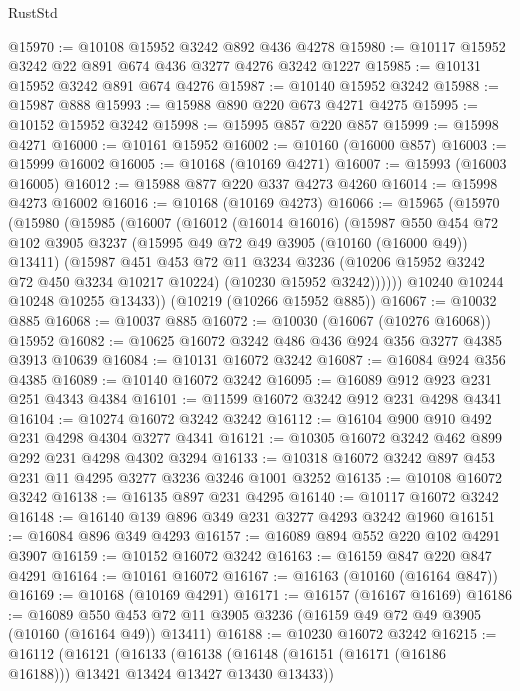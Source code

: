 \begin{lexlean}{RustStd}
\begin{coremodule}
@15970 := @10108 @15952 @3242 @892 @436 @4278
@15980 := @10117 @15952 @3242 @22 @891 @674 @436 @3277 @4276 @3242 @1227
@15985 := @10131 @15952 @3242 @891 @674 @4276
@15987 := @10140 @15952 @3242
@15988 := @15987 @888
@15993 := @15988 @890 @220 @673 @4271 @4275
@15995 := @10152 @15952 @3242
@15998 := @15995 @857 @220 @857
@15999 := @15998 @4271
@16000 := @10161 @15952
@16002 := @10160 (@16000 @857)
@16003 := @15999 @16002
@16005 := @10168 (@10169 @4271)
@16007 := @15993 (@16003 @16005)
@16012 := @15988 @877 @220 @337 @4273 @4260
@16014 := @15998 @4273 @16002
@16016 := @10168 (@10169 @4273)
@16066 := @15965
    (@15970
      (@15980
        (@15985
          (@16007
            (@16012
              (@16014 @16016)
              (@15987
                @550
                @454
                @72
                @102
                @3905
                @3237
                (@15995 @49 @72 @49 @3905 (@10160 (@16000 @49)) @13411)
                (@15987
                  @451
                  @453
                  @72
                  @11
                  @3234
                  @3236
                  (@10206 @15952 @3242 @72 @450 @3234 @10217 @10224)
                  (@10230 @15952 @3242))))))
        @10240
        @10244
        @10248
        @10255
        @13433))
    (@10219 (@10266 @15952 @885))
@16067 := @10032 @885
@16068 := @10037 @885
@16072 := @10030 (@16067 (@10276 @16068)) @15952
@16082 := @10625 @16072 @3242 @486 @436 @924 @356 @3277 @4385 @3913 @10639
@16084 := @10131 @16072 @3242
@16087 := @16084 @924 @356 @4385
@16089 := @10140 @16072 @3242
@16095 := @16089 @912 @923 @231 @251 @4343 @4384
@16101 := @11599 @16072 @3242 @912 @231 @4298 @4341
@16104 := @10274 @16072 @3242 @3242
@16112 := @16104 @900 @910 @492 @231 @4298 @4304 @3277 @4341
@16121 := @10305 @16072 @3242 @462 @899 @292 @231 @4298 @4302 @3294
@16133 := @10318 @16072 @3242 @897 @453 @231 @11 @4295 @3277 @3236 @3246 @1001 @3252
@16135 := @10108 @16072 @3242
@16138 := @16135 @897 @231 @4295
@16140 := @10117 @16072 @3242
@16148 := @16140 @139 @896 @349 @231 @3277 @4293 @3242 @1960
@16151 := @16084 @896 @349 @4293
@16157 := @16089 @894 @552 @220 @102 @4291 @3907
@16159 := @10152 @16072 @3242
@16163 := @16159 @847 @220 @847 @4291
@16164 := @10161 @16072
@16167 := @16163 (@10160 (@16164 @847))
@16169 := @10168 (@10169 @4291)
@16171 := @16157 (@16167 @16169)
@16186 := @16089
    @550
    @453
    @72
    @11
    @3905
    @3236
    (@16159 @49 @72 @49 @3905 (@10160 (@16164 @49)) @13411)
@16188 := @10230 @16072 @3242
@16215 := @16112
    (@16121
      (@16133
        (@16138 (@16148 (@16151 (@16171 (@16186 @16188))) @13421 @13424 @13427 @13430 @13433))

\end{coremodule}
\end{lexlean}
